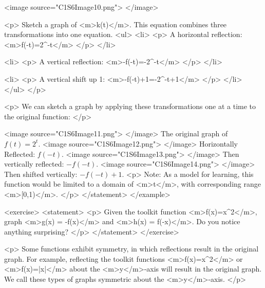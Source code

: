                 <image source="C1S6Image10.png">
                </image>

                <p>
                    Sketch a graph of <m>k(t)</m>.
                    This equation combines three transformations into one equation.
                    <ul>
                        <li>
                            <p>
                                A horizontal reflection: <m>f(-t)=2^{-t}</m>
                            </p>
                        </li>

                        <li>
                            <p>
                                A vertical reflection: <m>-f(-t)=-2^{-t}</m>
                            </p>
                        </li>

                        <li>
                            <p>
                                A vertical shift up 1: <m>-f(-t)+1=-2^{-t}+1</m>
                            </p>
                        </li>
                    </ul>
                </p>

                <p>
                    We can sketch a graph by applying these transformations one at a time to the original function:
                </p>

                <image source="C1S6Image11.png">
                </image>
                The original graph of $f(t)=2^{t}$.
                <image source="C1S6Image12.png">
                </image>
                Horizontally Reflected: $f(-t)$.
                <image source="C1S6Image13.png">
                </image>
                Then vertically reflected: $-f(-t)$.
                <image source="C1S6Image14.png">
                </image>
                Then shifted vertically: $-f(-t)+1$.
                <p>
                    Note: As a model for learning, this function would be limited to a domain of <m>t</m>, with corresponding range <m>[0,1)</m>.
                </p>
            </statement>
        </example>

        <exercise>
            <statement>
                <p>
                    Given the toolkit function <m>f(x)=x^{2}</m>, graph <m>g(x) = -f(x)</m> and <m>h(x) = f(-x)</m>.
                    Do you notice anything surprising?
                </p>
            </statement>
        </exercise>

        <p>
            Some functions exhibit symmetry, in which reflections result in the original graph.
            For example, reflecting the toolkit functions <m>f(x)=x^{2}</m> or <m>f(x)=|x|</m> about the <m>y</m>-axis will result in the original graph.
            We call these types of graphs symmetric about the <m>y</m>-axis.
        </p>

